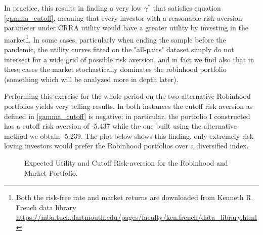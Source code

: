 In practice, this results in finding a very low $\gamma^*$ that satisfies equation \ref{gamma_cutoff}, meaning that every investor with a reasonable risk-aversion parameter under CRRA utility would have a greater utility by investing in the market\footnote{
Both the risk-free rate and market returns are downloaded from Kenneth R. French data library \url{https://mba.tuck.dartmouth.edu/pages/faculty/ken.french/data_library.html}}.
In some cases, particularly when ending the sample before the pandemic, the utility curves fitted on the "all-pairs" dataset simply do not intersect for a wide grid of possible risk aversion,
and in fact we find also that in these cases the market stochastically dominates the robinhood portfolio (something which will be analyzed more in depth later).

Performing this exercise for the whole period on the two alternative Robinhood portfolios yields very telling results.
In both instances the cutoff risk aversion as defined in \ref{gamma_cutoff} is negative; 
in particular, the portfolio I constructed has a cutoff risk aversion of -5.437 while the one built using the alternative method we obtain -5.239.
The plot below shows this finding, only extremely risk loving investors would prefer the Robinhood portfolios over a diversified index.  

\begin{figure}[h!]
  \centering
  \hfill
  \caption{Expected Utility and Cutoff Risk-aversion for the Robinhood and Market Portfolio.}
  \label{fig:cutoff_all_sidebyside}
\end{figure}

